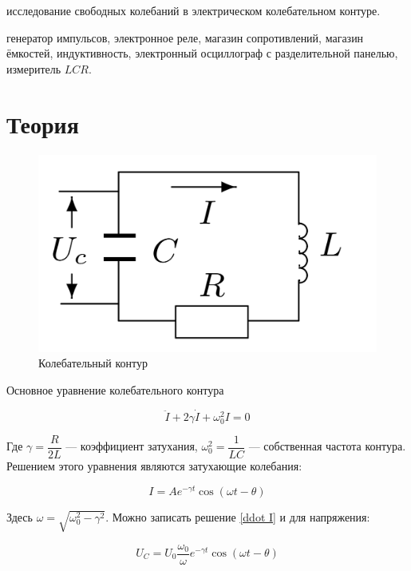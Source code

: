 \documentclass[a4paper,14pt]{article}
\begin{document}
\author{Рябых Владислав и Исыпов Илья, Б05-905}
\title{}
\maketitle

 исследование свободных колебаний в электрическом колебательном контуре.

 генератор импульсов, электронное реле, магазин сопротивлений, магазин ёмкостей, индуктивность, электронный осциллограф с разделительной панелью, измеритель $LCR$.


\section*{Теория}


\begin{center}
	\begin{figure}[bhtp]
		\centering
		\includegraphics[width=0.35\linewidth]{RLC.png}
		\caption{Колебательный контур}
		\label{RLC}
	\end{figure}
\end{center}

Основное уравнение колебательного контура 

\begin{equation}\label{ddot I}
\ddot{I} + 2\gamma\dot{I} + \omega_0^2I = 0
\end{equation}

Где $ \gamma = \dfrac{R}{2L} $ --- коэффициент затухания, $ \omega_0^2 = \dfrac{1}{LC} $ --- собственная частота контура. Решением этого уравнения являются затухающие колебания:

\begin{equation*}\label{}
I = A e^{-\gamma t} \cos (\omega t - \theta)
\end{equation*}

Здесь $ \omega = \sqrt{\omega_0^2 - \gamma^2} $. Можно записать решение \eqref{ddot I} и для напряжения:

\begin{equation*}\label{}
U_C = U_0 \dfrac{\omega_0}{\omega} e^{-\gamma t}\cos (\omega t - \theta)
\end{equation*}
\end{document}
